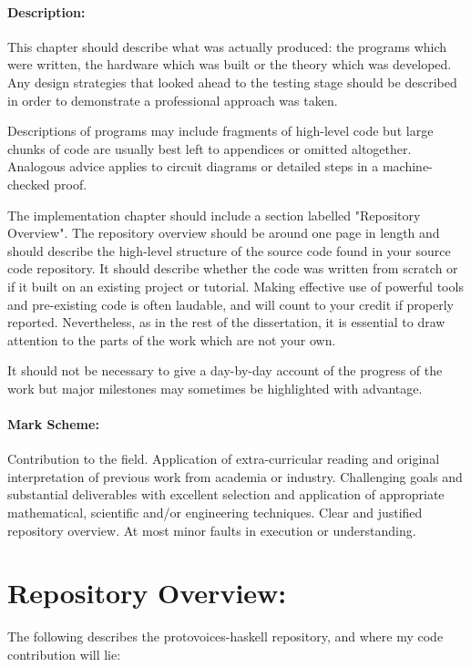 \documentclass[12pt,a4paper,twoside,openright]{report}
\begin{document}
\paragraph{Description: }
This chapter should describe what was actually produced: the programs which were written, the hardware which was built or the theory which was developed. Any design strategies that looked ahead to the testing stage should be described in order to demonstrate a professional approach was taken.
\par
Descriptions of programs may include fragments of high-level code but large chunks of code are usually best left to appendices or omitted altogether. Analogous advice applies to circuit diagrams or detailed steps in a machine-checked proof.
\par
The implementation chapter should include a section labelled "Repository Overview". The repository overview should be around one page in length and should describe the high-level structure of the source code found in your source code repository. It should describe whether the code was written from scratch or if it built on an existing project or tutorial. Making effective use of powerful tools and pre-existing code is often laudable, and will count to your credit if properly reported. Nevertheless, as in the rest of the dissertation, it is essential to draw attention to the parts of the work which are not your own. 
\par
It should not be necessary to give a day-by-day account of the progress of the work but major milestones may sometimes be highlighted with advantage.

\paragraph{Mark Scheme: }
Contribution to the field.
Application of extra-curricular reading and original interpretation of previous work from academia or industry.
Challenging goals and substantial deliverables with excellent selection and application of appropriate mathematical, scientific and/or engineering techniques.
Clear and justified repository overview.
At most minor faults in execution or understanding.

\section{Repository Overview:}
The following describes the protovoices-haskell repository, and where my code contribution will lie:
\par
\medskip
{}
\end{document}
